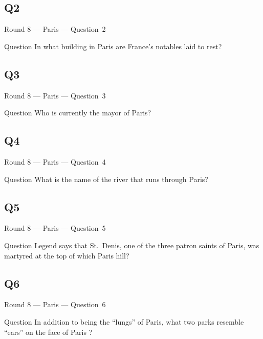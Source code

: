 \documentclass[11pt]{beamer}
\begin{document}
\subsection*{Q2}
\begin{frame}[t]{Round 8 --- Paris --- \mbox{Question 2}}
\vspace{-0.5em}
\begin{block}{Question}
In what building in Paris are France's notables laid to rest?
\end{block}
\end{frame}
\subsection*{Q3}
\begin{frame}[t]{Round 8 --- Paris --- \mbox{Question 3}}
\vspace{-0.5em}
\begin{block}{Question}
Who is currently the mayor of Paris?
\end{block}
\end{frame}
\subsection*{Q4}
\begin{frame}[t]{Round 8 --- Paris --- \mbox{Question 4}}
\vspace{-0.5em}
\begin{block}{Question}
What is the name of the river that runs through Paris?
\end{block}
\end{frame}
\subsection*{Q5}
\begin{frame}[t]{Round 8 --- Paris --- \mbox{Question 5}}
\vspace{-0.5em}
\begin{block}{Question}
Legend says that St.\ Denis, one of the three patron saints of Paris, was martyred at the top of which Paris hill?
\end{block}
\end{frame}
\subsection*{Q6}
\begin{frame}[t]{Round 8 --- Paris --- \mbox{Question 6}}
\vspace{-0.5em}
\begin{block}{Question}
In addition to being the ``lungs'' of Paris, what two parks resemble ``ears'' on the face of Paris ?
\end{block}
\end{frame}
\end{document}
